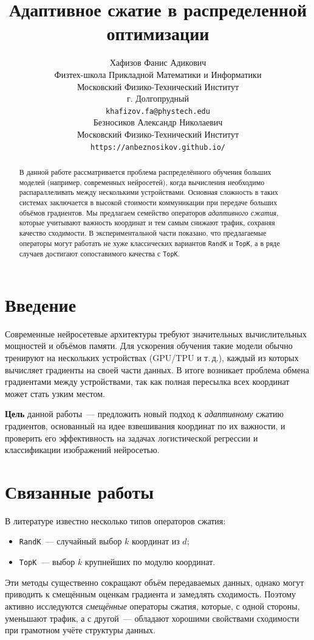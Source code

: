\documentclass{article}
\title{Адаптивное сжатие в распределенной оптимизации}
\author{ Хафизов Фанис Адикович \\
	Физтех-школа Прикладной Математики и Информатики\\
	Московский Физико-Технический Институт\\
	г. Долгопрудный\\
	\texttt{khafizov.fa@phystech.edu} \\
	\And
	Безносиков Александр Николаевич \\
	Московский Физико-Технический Институт\\
	\texttt{https://anbeznosikov.github.io/} \\
}
\date{}
\begin{document}
\maketitle

\begin{abstract}
В данной работе рассматривается проблема распределённого обучения больших моделей (например, современных нейросетей), когда вычисления необходимо распараллеливать между несколькими устройствами. Основная сложность в таких системах заключается в высокой стоимости коммуникации при передаче больших объёмов градиентов. Мы предлагаем семейство операторов \emph{адаптивного сжатия}, которые учитывают важность координат и тем самым снижают трафик, сохраняя качество сходимости. В экспериментальной части показано, что предлагаемые операторы могут работать не хуже классических вариантов \texttt{RandK} и \texttt{TopK}, а в ряде случаев достигают сопоставимого качества с \texttt{TopK}.
\end{abstract}


\section{Введение}
Современные нейросетевые архитектуры требуют значительных вычислительных мощностей и объёмов памяти. Для ускорения обучения такие модели обычно тренируют на нескольких устройствах (GPU/TPU и т.\,д.), каждый из которых вычисляет градиенты на своей части данных. В итоге возникает проблема обмена градиентами между устройствами, так как полная пересылка всех координат может стать узким местом.

\textbf{Цель} данной работы~--- предложить новый подход к \emph{адаптивному} сжатию градиентов, основанный на идее взвешивания координат по их важности, и проверить его эффективность на задачах логистической регрессии и классификации изображений нейросетью.

\section{Связанные работы}
В литературе известно несколько типов операторов сжатия:
\begin{itemize}
\item \texttt{RandK}~--- случайный выбор $k$ координат из $d$;
\item \texttt{TopK}~--- выбор $k$ крупнейших по модулю координат.
\end{itemize}
Эти методы существенно сокращают объём передаваемых данных, однако могут приводить к смещённым оценкам градиента и замедлять сходимость. Поэтому активно исследуются \emph{смещённые} операторы сжатия, которые, с одной стороны, уменьшают трафик, а с другой~--- обладают хорошими свойствами сходимости при грамотном учёте структуры данных.
\end{document}
